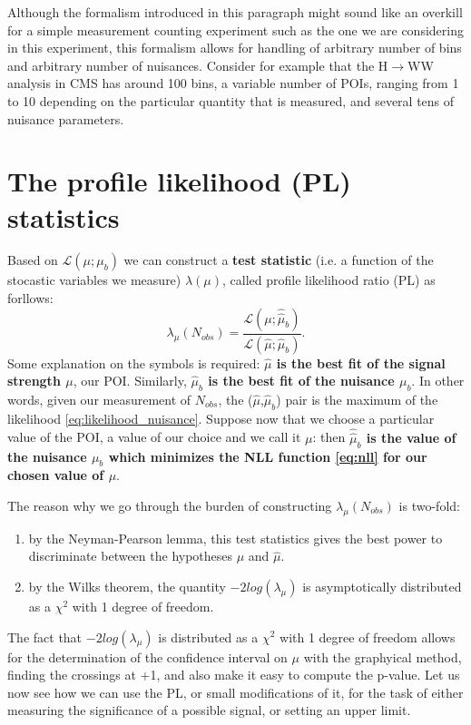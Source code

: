 \documentclass[a4paper,12pt]{article}
\begin{document}
Although the formalism introduced in this paragraph might sound like an
overkill for a simple measurement counting experiment such as the one we are
considering in this experiment, this formalism allows for handling of
arbitrary number of bins and arbitrary number of nuisances. Consider for
example that the H$\rightarrow{}$WW analysis in CMS has around 100 bins, a  variable number of
POIs, ranging from 1 to 10 depending on the particular quantity that is
measured, and
several tens of nuisance parameters.

\section{The profile likelihood (PL) statistics}
Based on $\mathcal{L}(\mu;\mu_b)$ we can construct a {\bf test statistic} (i.e. a
function of the stocastic variables we measure) $\lambda(\mu)$,
called profile likelihood ratio (PL) as
forllows:
\begin{equation}
\lambda_\mu(N_{obs})=\frac{\mathcal{L}(\mu;\hat{\hat{\mu}}_b)}{\mathcal{L}(\hat{\mu};\hat{\mu}_b)}.
\label{eq:llr}
\end{equation}
Some explanation on the symbols is required:  {\bf $\hat{\mu}$ is the best fit of
the signal strength $\mu$}, our POI. Similarly, {\bf $\hat{\mu}_b$ is the best fit
of the nuisance $\mu_b$}. In other words, given our measurement of $N_{obs}$,
the ($\hat{\mu}$,$\hat{\mu}_b$) pair is the
maximum of the
likelihood \ref{eq:likelihood_nuisance}. Suppose now that we choose a
particular value of the POI, a value of our choice and we call it $\mu$: then
{\bf $\hat{\hat{\mu}}_b$ is the value of the nuisance $\mu_b$ which minimizes the
NLL function \ref{eq:nll} for our chosen value of $\mu$}.

The reason why we go through the burden of constructing $\lambda_\mu(N_{obs})$
is two-fold: 
\begin{enumerate}
\item by the Neyman-Pearson lemma, this test statistics gives the
best power to discriminate between the hypotheses $\mu$ and $\hat{\mu}$. 
\item by the Wilks theorem, the quantity $-2log(\lambda_\mu)$ is asymptotically
distributed as a $\chi^2$ with 1 degree of freedom.
\end{enumerate}
The fact that $-2log(\lambda_\mu)$ is distributed as a $\chi^2$ with 1 degree
of freedom allows for the determination of the confidence interval on $\mu$
with the graphyical method, finding the crossings at +1, and also make it easy
to compute the p-value.
Let us now see how we can use the PL, or small modifications of it, for the
task of either measuring the significance of a possible signal, or setting an
upper limit.
\end{document}
